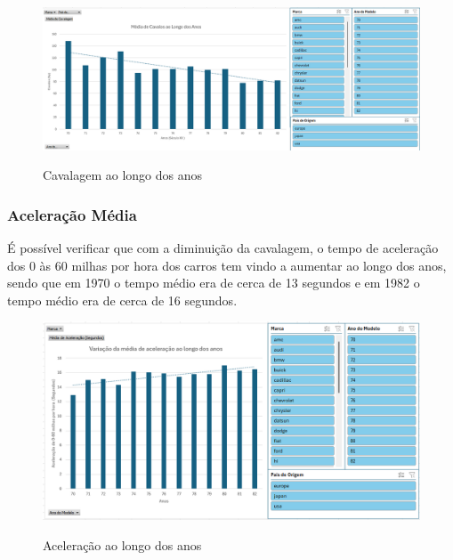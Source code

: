 \documentclass[a4paper]{article}
\begin{document}
\begin{figure}[h!]
    \centering
    \includegraphics[width=1\textwidth]{Recursos/CavalagemGrafico.png} %
    \vspace{0.5cm}
    \label{fig:cavg}
    \caption{Cavalagem ao longo dos anos}
\end{figure}

\newpage
\subsubsection{Aceleração Média}
É possível verificar que com a diminuição da cavalagem, o tempo de aceleração dos 0 às 60 milhas por hora dos carros tem vindo a 
aumentar ao longo dos anos, sendo que em 1970 o tempo médio era de cerca de 13 segundos e em 1982 o tempo médio
era de cerca de 16 segundos.
\begin{figure}[h!]
    \centering
    \includegraphics[width=1\textwidth]{Recursos/AceleraçãoMediaGrafico.png} %
    \vspace{0.5cm}
    \label{fig:accmg}
    \caption{Aceleração ao longo dos anos}
\end{figure}
\newpage
\end{document}

